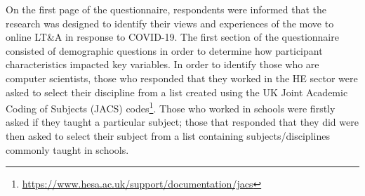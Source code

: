 \documentclass[conference]{IEEEtran}
\begin{document}

On the first page of the questionnaire, respondents were informed that
the research was designed to identify their views and experiences of
the move to online LT\&A in response to COVID-19. The first section of
the questionnaire consisted of demographic questions in order to
determine how participant characteristics impacted key variables. In
order to identify those who are computer scientists, those who
responded that they worked in the HE sector were asked to select their
discipline from a list created using the UK Joint Academic Coding of
Subjects (JACS)
codes\footnote{\url{https://www.hesa.ac.uk/support/documentation/jacs}}. Those
who worked in schools were firstly asked if they taught a particular
subject; those that responded that they did were then asked to select
their subject from a list containing subjects/disciplines commonly
taught in schools.

\end{document}
